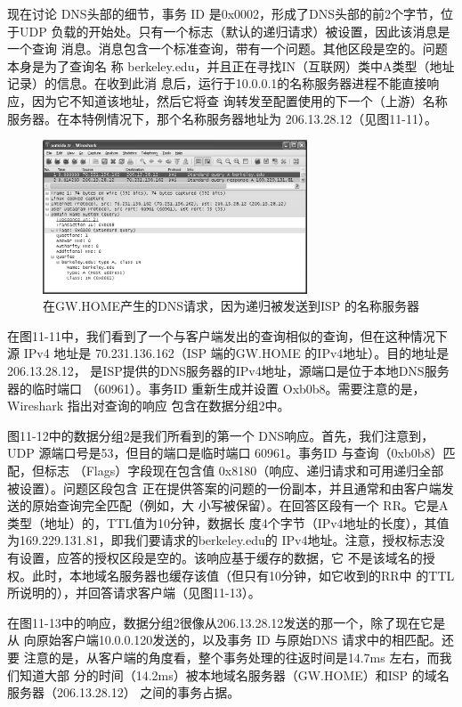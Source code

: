 现在讨论 DNS头部的细节，事务 ID 是0x0002，形成了DNS头部的前2个字节，位
于UDP 负载的开始处。只有一个标志（默认的递归请求）被设置，因此该消息是一个查询
消息。消息包含一个标准查询，带有一个问题。其他区段是空的。问题本身是为了查询名
称 berkeley.edu，并且正在寻找IN（互联网）类中A类型（地址记录）的信息。在收到此消
息后，运行于10.0.0.1的名称服务器进程不能直接响应，因为它不知道该地址，然后它将查
询转发至配置使用的下一个（上游）名称服务器。在本特例情况下，那个名称服务器地址为
206.13.28.12（见图11-11）。

\begin{figure}[!htb]
    \centering
	\includegraphics[width=0.7\textwidth]{imgs/11/11-11.png}
	\caption{在GW.HOME产生的DNS请求，因为递归被发送到ISP 的名称服务器}
\end{figure}

在图11-11中，我们看到了一个与客户端发出的查询相似的查询，但在这种情况下源
IPv4 地址是 70.231.136.162（ISP 端的GW.HOME 的IPv4地址）。目的地址是206.13.28.12，
是ISP提供的DNS服务器的IPv4地址，源端口是位于本地DNS服务器的临时端口
（60961）。事务ID 重新生成并设置 Oxb0b8。需要注意的是，Wireshark 指出对查询的响应
包含在数据分组2中。

图11-12中的数据分组2是我们所看到的第一个 DNS响应。首先，我们注意到，UDP
源端口号是53，但目的端口是临时端口 60961。事务ID 与查询（0xb0b8）匹配，但标志
（Flags）字段现在包含值 0x8180（响应、递归请求和可用递归全部被设置）。问题区段包含
正在提供答案的问题的一份副本，并且通常和由客户端发送的原始查询完全匹配（例如，大
小写被保留）。在回答区段有一个 RR。它是A类型（地址）的，TTL值为10分钟，数据长
度4个字节（IPv4地址的长度），其值为169.229.131.81，即我们要请求的berkeley.edu的
IPv4地址。注意，授权标志没有设置，应答的授权区段是空的。该响应基于缓存的数据，它
不是该域名的授权。此时，本地域名服务器也缓存该值（但只有10分钟，如它收到的RR中
的TTL 所说明的），并回答请求客户端（见图11-13）。

在图11-13中的响应，数据分组2很像从206.13.28.12发送的那一个，除了现在它是从
向原始客户端10.0.0.120发送的，以及事务 ID 与原始DNS 请求中的相匹配。还要
注意的是，从客户端的角度看，整个事务处理的往返时间是14.7ms 左右，而我们知道大部
分的时间（14.2ms）被本地域名服务器（GW.HOME）和ISP 的域名服务器（206.13.28.12）
之间的事务占据。

